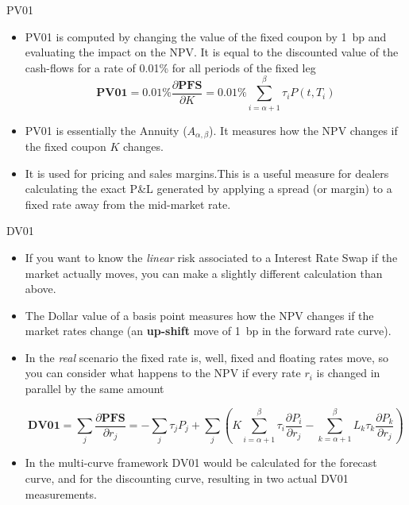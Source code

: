 \documentclass{beamer}
\begin{document}
\begin{frame}{PV01}
	\begin{itemize}
		\item<1-> \textcolor{maincolor}{PV01} is computed by changing the value of the fixed coupon by 1~bp and evaluating the impact on the NPV. It is equal to the discounted value of the cash-flows for a rate of 0.01\% for all periods of the fixed leg
		\begin{equation}
			\textbf{PV01} = 0.01\% \frac{\partial \textbf{PFS}}{\partial K} = 0.01\% \sum_{i=\alpha+1}^\beta\tau_iP(t,T_i)
		\end{equation}
		\item<2-> PV01 is essentially the Annuity ($A_{\alpha,\beta}$). It measures how the NPV changes if the fixed coupon $K$ changes.
		\item<3-> It is used for pricing and sales margins.This is a useful measure for dealers calculating the exact P\&L generated by applying a spread (or margin) to a fixed rate away from the mid-market rate.
	\end{itemize}
\end{frame}

\begin{frame}{DV01}
	\begin{itemize}
		\item<1-> If you want to know the \emph{linear} risk associated to a Interest Rate Swap if the market actually moves, you can make a slightly different calculation than above.
		\item<2-> The \textcolor{maincolor}{Dollar value of a basis point} measures how the NPV changes if the market rates change (an \textbf{up-shift} move of 1~bp in the forward rate curve).
		\item<3-> In the \emph{real} scenario the fixed rate is, well, fixed and floating rates move, so you can consider what happens to the NPV if every rate $r_i$ is changed in parallel by the same amount
		
		\begin{equation*}
			\textbf{DV01} = \sum_j \frac{\partial \textbf{PFS}}{\partial r_j} = -\sum_{j}\tau_jP_j+\sum_{j}\left(K\sum_{i=\alpha+1}^\beta\tau_i\frac{\partial P_i}{\partial r_j} - \sum_{k=\alpha+1}^\beta L_k\tau_k\frac{\partial P_k}{\partial r_j}\right)
		\end{equation*}
		\item<4-> In the multi-curve framework DV01 would be calculated for the forecast curve, and for the discounting curve, resulting in two actual DV01 measurements.
	\end{itemize}
\end{frame}
\end{document}
